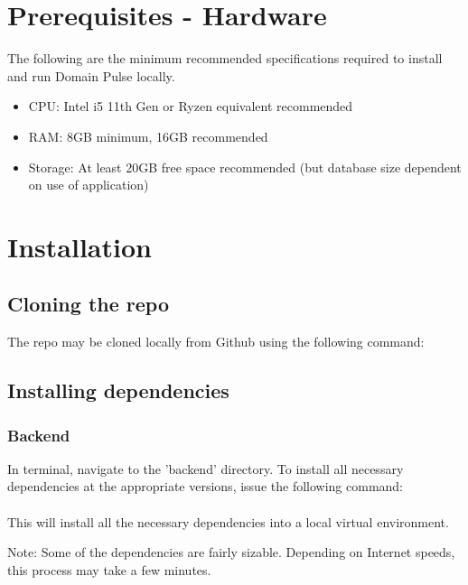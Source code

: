 \documentclass[12pt]{article}
\begin{document}
\section{Prerequisites - Hardware}
The following are the minimum recommended specifications required to install and run Domain Pulse locally.
\begin{itemize}
    \item CPU: Intel i5 11th Gen or Ryzen equivalent recommended
    \item RAM: 8GB minimum, 16GB recommended
    \item Storage: At least 20GB free space recommended (but database size dependent on use of application)
\end{itemize}


\section{Installation}

\subsection{Cloning the repo}
The repo may be cloned locally from Github using the following command: \\



\subsection{Installing dependencies}
\subsubsection{Backend}
In terminal, navigate to the 'backend' directory. To install all necessary dependencies at the appropriate versions, issue the following
command: \\
\\
This will install all the necessary dependencies into a local virtual environment.

Note: Some of the dependencies are fairly sizable. Depending on Internet speeds, this process may take a few minutes.
\end{document}
